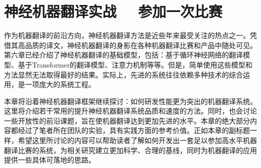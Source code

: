 
%


\renewcommand\figurename{图} %
\renewcommand\tablename{表}%


\chapter{神经机器翻译实战 \ \dash \ 参加一次比赛}

\parinterval 作为机器翻译的前沿方向，神经机器翻译方法是近些年来最受关注的热点之一。凭借其高品质的译文，神经机器翻译的身影在各种机器翻译比赛和产品中随处可见。第六章已经介绍了神经机器翻译的基础模型，包括：基于循环神经网络的翻译模型、基于Transformer的翻译模型、注意力机制等等。但是，简单使用这些模型和方法显然无法取得最好的结果。实际上，先进的系统往往依赖多种技术的综合运用，是一项庞大的系统工程。

\parinterval 本章将沿着神经机器翻译框架继续探讨：如何研发性能更为突出的机器翻译系统。这里将介绍若干常用的提升神经机器翻译系统品质和速度的方法。同时，也会讨论一些开放性的前沿课题，旨在使机器翻译达到更加先进的水平。本章的绝大部分内容都经过了笔者所在团队的实验，具有实践方面的参考价值。正如本章的副标题一样，希望这里所讨论的内容可以帮助读者了解如何开发出一套足以参加高水平机器翻译比赛的系统，为相关研究建立更加科学、合理的基线，同时为机器翻译的应用提供一些具体可落地的思路。



